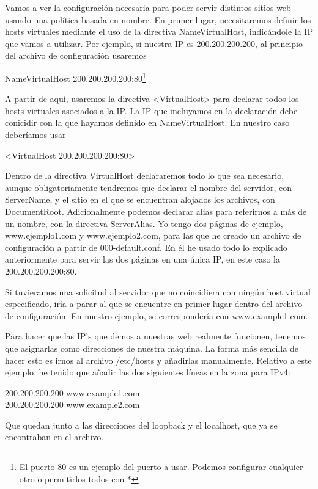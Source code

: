 \documentclass[a4paper, 10pt]{article} %
\begin{document}
Vamos a ver la configuración necesaria para poder servir distintos sitios web usando una política basada en nombre. En primer lugar, necesitaremos definir los hosts virtuales mediante el uso de la directiva NameVirtualHost, indicándole la IP que vamos a utilizar. Por ejemplo, si nuestra IP es 200.200.200.200, al principio del archivo de configuración usaremos 

NameVirtualHost 200.200.200.200:80\footnote{El puerto 80 es un ejemplo del puerto a usar. Podemos configurar cualquier otro o permitirlos todos con *}

A partir de aquí, usaremos la directiva <VirtualHost> para declarar todos los hosts virtuales asociados a la IP. La IP que incluyamos en la declaración debe conicidir con la que hayamos definido en NameVirtualHost. En nuestro caso deberíamos usar 

<VirtualHost 200.200.200.200:80>

Dentro de la directiva VirtualHost declararemos todo lo que sea necesario, aunque obligatoriamente tendremos que declarar el nombre del servidor, con ServerName, y el sitio en el que se encuentran alojados los archivos, con DocumentRoot. Adicionalmente podemos declarar alias para referirnos a más de un nombre, con la directiva ServerAlias. Yo tengo dos páginas de ejemplo, www.ejemplo1.com y www.ejemplo2.com, para las que he creado un archivo de configuración a partir de 000-default.conf. En él he usado todo lo explicado anteriormente para servir las dos páginas en una única IP, en este caso la 200.200.200.200:80. 


Si tuvieramos una solicitud al servidor que no coincidiera con ningún host virtual especificado, iría a parar al que se encuentre en primer lugar dentro del archivo de configuración. En nuestro ejemplo, se correspondería con www.example1.com. 

Para hacer que las IP's que demos a nuestras web realmente funcionen, tenemos que asignarlas como direcciones de nuestra máquina. La forma más sencilla de hacer esto es irnos al archivo /etc/hosts y añadirlas manualmente. Relativo a este ejemplo, he tenido que añadir las dos siguientes líneas en la zona para IPv4: 

200.200.200.200 www.example1.com\\
200.200.200.200 www.example2.com

Que quedan junto a las direcciones del loopback y el localhost, que ya se encontraban en el archivo. 
\end{document}
